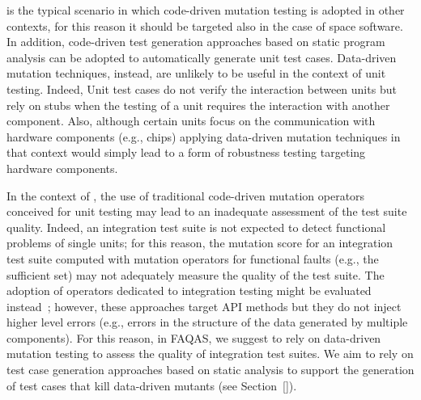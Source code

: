 
 is the typical scenario in which code-driven mutation testing is adopted in other contexts, for this reason it should be targeted also in the case of space software.
In addition, code-driven test generation approaches based on static program analysis can be adopted to automatically generate unit test cases.
Data-driven mutation techniques, instead, are unlikely to be useful in the context of unit testing.
Indeed, Unit test cases do not verify the interaction between units but rely on stubs when the testing of  a unit requires the interaction with another component.
Also, although certain units focus on the communication with hardware components (e.g., chips) applying data-driven mutation techniques in that context would simply lead to a form of robustness testing targeting hardware components.


In the context of , the use of traditional code-driven mutation operators conceived for unit testing may lead to an inadequate assessment of the test suite quality.
Indeed, an integration test suite is not expected to detect functional problems of single units; for this reason, the mutation score for an integration test suite computed with mutation operators for functional faults (e.g., the sufficient set) may not adequately measure the quality of the test suite.
The adoption of operators dedicated to integration testing might be evaluated instead~\cite{grechanik2016mutation,delamaro2001proteum}; however, these approaches target API methods but they do not inject higher level errors (e.g., errors in the structure of the data generated by multiple components). For this reason, in FAQAS, we suggest to rely on data-driven mutation testing to assess the quality of integration test suites. We aim to rely on test case generation approaches based on static analysis to support the generation of test cases that kill data-driven mutants (see Section~\ref{}).


